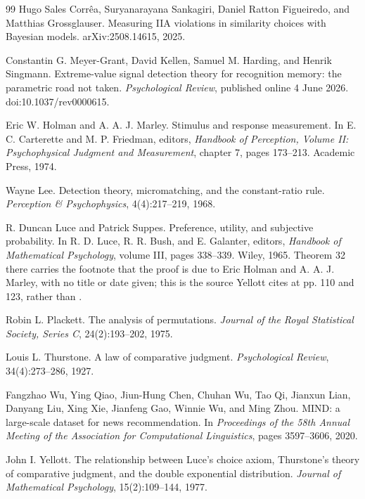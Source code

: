 \documentclass[11pt]{article}
\theoremstyle{italichead}
\begin{document}
\begin{thebibliography}{99}
Hugo Sales Corr\^{e}a, Suryanarayana Sankagiri, Daniel Ratton Figueiredo, and Matthias
Grossglauser.
Measuring IIA violations in similarity choices with Bayesian models.
arXiv:2508.14615, 2025.

Constantin G. Meyer-Grant, David Kellen, Samuel M. Harding, and Henrik Singmann.
Extreme-value signal detection theory for recognition memory: the parametric road not taken.
\emph{Psychological Review}, published online 4 June 2026. doi:10.1037/rev0000615.

Eric W. Holman and A. A. J. Marley.
Stimulus and response measurement.
In E. C. Carterette and M. P. Friedman, editors, \emph{Handbook of Perception, Volume II:
Psychophysical Judgment and Measurement}, chapter 7, pages 173--213. Academic Press, 1974.

Wayne Lee.
Detection theory, micromatching, and the constant-ratio rule.
\emph{Perception \& Psychophysics}, 4(4):217--219, 1968.

R. Duncan Luce and Patrick Suppes.
Preference, utility, and subjective probability.
In R. D. Luce, R. R. Bush, and E. Galanter, editors, \emph{Handbook of Mathematical
Psychology}, volume III, pages 338--339. Wiley, 1965.
Theorem 32 there carries the footnote that the proof is due to Eric Holman and
A. A. J. Marley, with no title or date given; this is the source Yellott \cite{yellott1977}
cites at pp. 110 and 123, rather than \cite{holman1974}.

Robin L. Plackett.
The analysis of permutations.
\emph{Journal of the Royal Statistical Society, Series C}, 24(2):193--202, 1975.

Louis L. Thurstone.
A law of comparative judgment.
\emph{Psychological Review}, 34(4):273--286, 1927.

Fangzhao Wu, Ying Qiao, Jiun-Hung Chen, Chuhan Wu, Tao Qi, Jianxun Lian, Danyang Liu,
Xing Xie, Jianfeng Gao, Winnie Wu, and Ming Zhou.
MIND: a large-scale dataset for news recommendation.
In \emph{Proceedings of the 58th Annual Meeting of the Association for Computational
Linguistics}, pages 3597--3606, 2020.

John I. Yellott.
The relationship between Luce's choice axiom, Thurstone's theory of comparative
judgment, and the double exponential distribution.
\emph{Journal of Mathematical Psychology}, 15(2):109--144, 1977.


\end{thebibliography}
\end{document}
